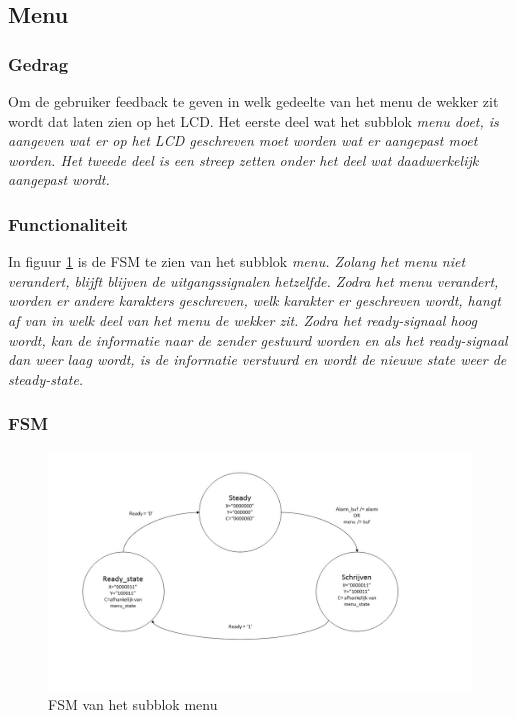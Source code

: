 \subsection{Menu}

\subsubsection{Gedrag}
Om de gebruiker feedback te geven in welk gedeelte van het menu de wekker zit wordt dat laten zien op het LCD. Het eerste deel wat het subblok \it{menu} doet, is aangeven wat er op het LCD geschreven moet worden wat er aangepast moet worden. Het tweede deel is een streep zetten onder het deel wat daadwerkelijk aangepast wordt.

\subsubsection{Functionaliteit}
In figuur \ref{fig:FSMmenu} is de FSM te zien van het subblok \it{menu}. Zolang het menu niet verandert, blijft blijven de uitgangssignalen hetzelfde. Zodra het menu verandert, worden er andere karakters geschreven, welk karakter er geschreven wordt, hangt af van in welk deel van het menu de wekker zit. Zodra het ready-signaal hoog wordt, kan de informatie naar de zender gestuurd worden en als het ready-signaal dan weer laag wordt, is de informatie verstuurd en wordt de nieuwe state weer de steady-state.

\subsubsection{FSM}

\begin{figure}[h!]
\includegraphics[width=15cm]{verslagschemas/FSMs/menu.jpg}
\caption{FSM van het subblok menu}
\label{fig:FSMmenu}
\end{figure}


